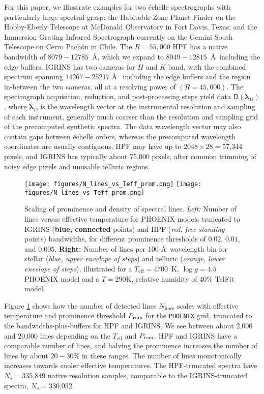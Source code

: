 \documentclass[modern]{aastex631}
\begin{document}
For this paper, we illustrate examples for two \'echelle spectrographs with particularly large spectral grasp: the Habitable Zone Planet Finder \citep[HPF,][]{2014SPIE.9147E..1GM} on the Hobby-Eberly Telescope at McDonald Observatory in Fort Davis, Texas; and the Immersion Grating Infrared Spectrograph \citep[IGRINS,][]{park14}
currently on the Gemini South Telescope on Cerro Pach\'on in Chile. The $R=55,000$ HPF has a native bandwidth of $8079-12785$~\AA, which we expand to $8049-12815$~\AA~including the edge buffers. IGRINS has two cameras for $H$ and $K$ band, with the combined spectrum spanning $14267-25217\;$\AA~ including the edge buffers and the region in-between the two cameras, all at a resolving power of $(R=45,000)$. The spectrograph acquisition, reduction, and post-processing steps yield data $\mathsf{D}(\bm{\lambda}_{D})$, where $\bm{\lambda}_{D}$ is the wavelength vector at the instrumental resolution and sampling of each instrument, generally much coarser than the resolution and sampling grid of the precomputed synthetic spectra. The data wavelength vector may also contain gaps between \'echelle orders, whereas the precomputed wavelength coordinates are usually contiguous. HPF may have up to $2048\times28=$57,344 pixels, and IGRINS has typically about 75,000 pixels, after common trimming of noisy edge pixels and unusable telluric regions.


\begin{figure}[hbt!]
    \centering
    \texttt{[image: figures/N\_lines\_vs\_Teff\_prom.png]}
    \texttt{[image: figures/N\_lines\_vs\_Teff\_prom.png]}
    \caption{Scaling of prominence and density of spectral lines.
        \emph{Left:} Number of lines versus effective temperature for PHOENIX models truncated to IGRINS (\textbf{blue, connected} points) and HPF (\emph{red, free-standing} points) bandwidths, for different prominence thresholds of $0.02$, $0.01$, and $0.005$.
        \textbf{Right:} Number of lines per 100 \AA\ wavelength bin for stellar (\emph{blue, upper envelope of steps}) and telluric (\emph{orange, lower envelope of steps}), illustrated for a $T_\mathrm{eff}=4700$~K, $\log{g}=4.5$ PHOENIX model and a $T=290 \mathrm{K}$, relative humidity of 40\% TelFit model.}
    \label{fig_Nlines_vs_teff}
\end{figure}


Figure \ref{fig_Nlines_vs_teff} shows how the number of detected lines $N_{\mathrm{lines}}$ scales with effective temperature and prominence threshold $P_{\rm rom}$ for the \texttt{PHOENIX} grid, truncated to the bandwidths-plus-buffers for HPF and IGRINS. We see between about 2,000 and 20,000 lines depending on the $T_{\mathrm{eff}}$ and $P_{\rm rom}$. HPF and IGRINS have a comparable number of lines, and halving the prominence increases the number of lines by about $20-30\%$ in these ranges. The number of lines monotonically increases towards cooler effective temperatures.
The HPF-truncated spectra have $N_s=$335,849 native resolution samples, comparable to the IGRINS-truncated spectra, $N_s=$330,052.
\end{document}
